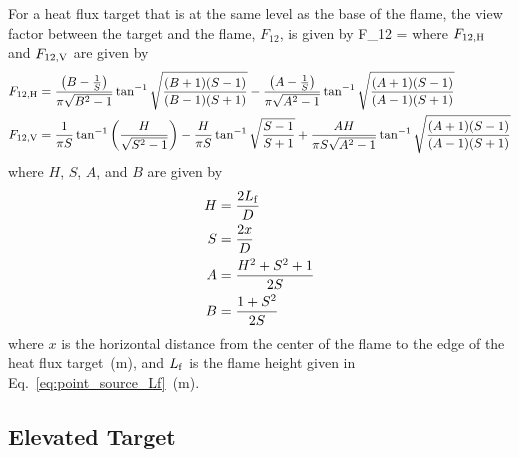 \noindent For a heat flux target that is at the same level as the base of the flame, the view factor between the target and the flame, $F_{12}$, is given by
\be
F_{12} = 
\label{eq:solid_flame_F12_HV}
\ee
where $F\sb{12, H}$ and $F\sb{12, V}$ are given by
\begin{align}
F\sb{12, H} &= \frac{\left( B - \frac{1}{S} \right)}{\pi \sqrt{B^2 - 1}} \tan^{-1} \sqrt{ \frac{(B+1)(S-1)}{(B-1)(S+1)} } -
\frac{\left( A - \frac{1}{S} \right)}{\pi \sqrt{A^2 - 1}} \tan^{-1} \sqrt{ \frac{(A+1)(S-1)}{(A-1)(S+1)} } \\
F\sb{12, V} &= \frac{1}{\pi S} \tan^{-1} \left( \frac{H}{\sqrt{S^2-1}} \right) - \frac{H}{\pi S} \tan^{-1} \sqrt{\frac{S-1}{S+1}} +
\frac{A H}{\pi S \sqrt{A^2-1}} \tan^{-1} \sqrt{\frac{(A+1)(S-1)}{(A-1)(S+1)}}
\label{eq:solid_flame_F12_H_V}
\end{align}
where $H$, $S$, $A$, and $B$ are given by
\begin{align}
H &= \frac{2 L\sb{f}}{D}        \\
S &= \frac{2 x}{D}              \\
A &= \frac{H^2 + S^2 + 1}{2 S}  \\
B &= \frac{1+S^2}{2 S}
\label{eq:solid_flame_H_S_A_B}
\end{align}
where $x$ is the horizontal distance from the center of the flame to the edge of the heat
flux target~(\si{m}), and $L\sb{f}$ is the flame height given in Eq.~\ref{eq:point_source_Lf}~(\si{m}).


\clearpage


\subsection*{Elevated Target}

